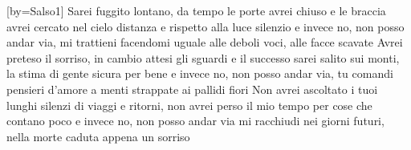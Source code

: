 [by={Salso1}]
\beginverse
Sarei fuggito lontano,
da tempo le porte avrei chiuso
e le braccia avrei cercato nel cielo
distanza e rispetto alla luce silenzio
e invece no, non posso andar via,
mi trattieni facendomi uguale alle deboli voci,
alle facce scavate
Avrei preteso il sorriso,
in cambio attesi gli sguardi e il successo
sarei salito sui monti,
la stima di gente sicura per bene
e invece no, non posso andar via,
tu comandi pensieri d'amore
a menti strappate ai pallidi fiori
Non avrei ascoltato i tuoi lunghi silenzi
di viaggi e ritorni,
non avrei perso il mio tempo
per cose che contano poco
e invece no, non posso andar via
mi racchiudi nei giorni futuri,
nella morte caduta appena un sorriso
\endverse
\endsong
